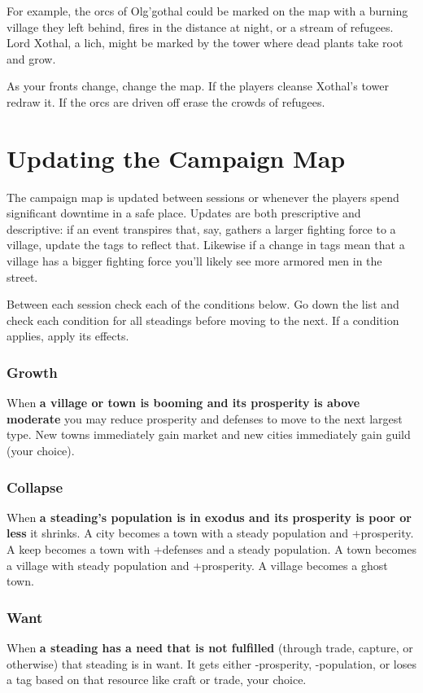  For example, the orcs of Olg'gothal could be marked on the map with a burning village they left behind, fires in the distance at night, or a stream of refugees. Lord Xothal, a lich, might be marked by the tower where dead plants take root and grow.


 As your fronts change, change the map. If the players cleanse Xothal's tower redraw it. If the orcs are driven off erase the crowds of refugees.
\section{Updating the Campaign Map}


 The campaign map is updated between sessions or whenever the players spend significant downtime in a safe place. Updates are both prescriptive and descriptive: if an event transpires that, say, gathers a larger fighting force to a village, update the tags to reflect that. Likewise if a change in tags mean that a village has a bigger fighting force you'll likely see more armored men in the street.


 Between each session check each of the conditions below. Go down the list and check each condition for all steadings before moving to the next. If a condition applies, apply its effects.
\subsubsection{Growth}


 When \textbf{a village or town is booming and its prosperity is above moderate}
 you may reduce prosperity and defenses to move to the next largest type. New towns immediately gain market and new cities immediately gain guild (your choice).
\subsubsection{Collapse}


 When \textbf{a steading's population is in exodus and its prosperity is poor or less}
 it shrinks. A city becomes a town with a steady population and +prosperity. A keep becomes a town with +defenses and a steady population. A town becomes a village with steady population and +prosperity. A village becomes a ghost town.
\subsubsection{Want}


 When \textbf{a steading has a need that is not fulfilled}
 (through trade, capture, or otherwise) that steading is in want. It gets either -prosperity, -population, or loses a tag based on that resource like craft or trade, your choice.
